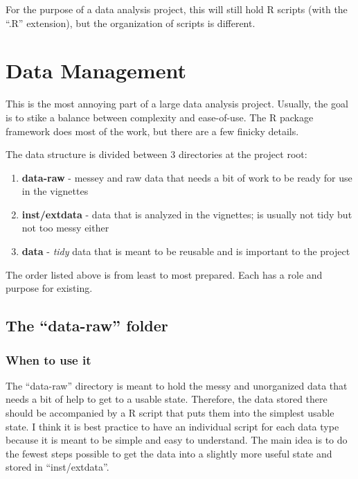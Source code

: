 \documentclass[]{book}
\providecommand{\tightlist}{%
  \setlength{\itemsep}{0pt}\setlength{\parskip}{0pt}}
\begin{document}
For the purpose of a data analysis project, this will still hold R scripts (with the ``.R'' extension), but the organization of scripts is different.

\hypertarget{data-management}{%
\chapter{Data Management}\label{data-management}}

This is the most annoying part of a large data analysis project. Usually, the goal is to stike a balance between complexity and ease-of-use. The R package framework does most of the work, but there are a few finicky details.

The data structure is divided between 3 directories at the project root:

\begin{enumerate}
\def\labelenumi{\arabic{enumi}.}
\tightlist
\item
  \textbf{data-raw} - messey and raw data that needs a bit of work to be ready for use in the vignettes
\item
  \textbf{inst/extdata} - data that is analyzed in the vignettes; is usually not tidy but not too messy either
\item
  \textbf{data} - \emph{tidy} data that is meant to be reusable and is important to the project
\end{enumerate}

The order listed above is from least to most prepared. Each has a role and purpose for existing.

\hypertarget{the-data-raw-folder}{%
\section{The ``data-raw'' folder}\label{the-data-raw-folder}}

\hypertarget{when-to-use-it}{%
\subsection{When to use it}\label{when-to-use-it}}

The ``data-raw'' directory is meant to hold the messy and unorganized data that needs a bit of help to get to a usable state. Therefore, the data stored there should be accompanied by a R script that puts them into the simplest usable state. I think it is best practice to have an individual script for each data type because it is meant to be simple and easy to understand. The main idea is to do the fewest steps possible to get the data into a slightly more useful state and stored in ``inst/extdata''.
\end{document}

